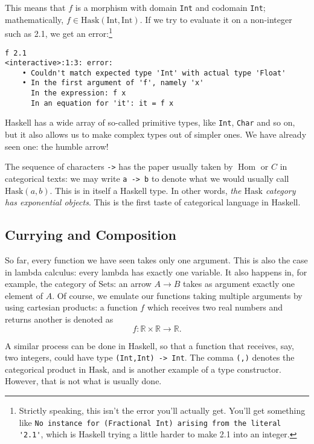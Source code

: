 \documentclass[11pt]{article}
\theoremstyle{nonumberplain}
\newcommand{\R}{\mathbb{R}}
\newcommand{\Hask}{\mathrm{Hask}}
\newcommand{\type}[1]{\mathrm{#1}}
\newcommand{\cat}[1]{\mathrm{#1}}
\DeclareMathOperator{\Hom}{Hom}
\newcommand*\lsin{\lstinline}
\begin{document}
This means that $f$ is a morphism with domain \lstinline|Int| and codomain \lstinline|Int|; mathematically, $f \in \Hask(\type{Int}, \type{Int})$. If we try to evaluate it on a non-integer such as 2.1, we get an error:\footnote{Strictly speaking, this isn't the error you'll actually get. You'll get something like \lstinline|No instance for (Fractional Int) arising from the literal '2.1'|, which is Haskell trying a little harder to make 2.1 into an integer.}
\begin{lstlisting}
f 2.1
<interactive>:1:3: error:
    • Couldn't match expected type 'Int' with actual type 'Float'
    • In the first argument of 'f', namely 'x'
      In the expression: f x
      In an equation for 'it': it = f x
\end{lstlisting}

Haskell has a wide array of so-called primitive types, like \lstinline|Int|, \lstinline|Char| and so on, but it also allows us to make complex types out of simpler ones. We have already seen one: the humble arrow!

The sequence of characters \lstinline|->| has the paper usually taken by $\Hom$ or $C$ in categorical texts: we may write \lsin|a -> b| to denote what we would usually call $\Hask(a,b)$. This is in itself a Haskell type. In other words, \emph{the $\Hask$ category has exponential objects}. This is the first taste of categorical language in Haskell.

\subsection{Currying and Composition}

So far, every function we have seen takes only one argument. This is also the case in lambda calculus: every lambda has exactly one variable. It also happens in, for example, the category of $\cat{Sets}$: an arrow $A \to B$ takes as argument exactly one element of $A$. Of course, we emulate our functions taking multiple arguments by using cartesian products: a function $f$ which receives two real numbers and returns another is denoted as
\begin{equation}
f \colon \R \times \R \to \R.
\end{equation}

A similar process can be done in Haskell, so that a function that receives, say, two integers, could have type \lsin|(Int,Int) -> Int|. The comma \lsin|(,)| denotes the categorical product in $\Hask$, and is another example of a type constructor. However, that is not what is usually done.
\end{document}
